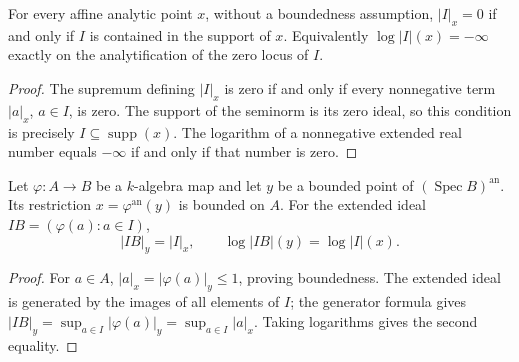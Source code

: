 \begin{lemma}
\label{lem:ideal-function-vanishing}
\leanok
{}
For every affine analytic point $x$, without a boundedness assumption,
$|I|_x=0$ if and only if $I$ is contained in the support of $x$.
Equivalently $\log|I|(x)=-\infty$ exactly on the analytification of the
zero locus of $I$.
\end{lemma}
\begin{proof}
The supremum defining $|I|_x$ is zero if and only if every nonnegative
term $|a|_x$, $a\in I$, is zero. The support of the seminorm is its
zero ideal, so this condition is precisely $I\subseteq\operatorname{supp}(x)$.
The logarithm of a nonnegative extended real number equals $-\infty$
if and only if that number is zero.
\end{proof}

\begin{lemma}
\label{lem:ideal-function-pullback}
\leanok
{}
Let $\varphi\colon A\to B$ be a $k$-algebra map and let $y$ be a
bounded point of $(\operatorname{Spec} B)^{\mathrm{an}}$. Its restriction
$x=\varphi^{\mathrm{an}}(y)$ is bounded on $A$. For the extended ideal
$IB=(\varphi(a):a\in I)$,
\[
 |IB|_y=|I|_x,\qquad \log|IB|(y)=\log|I|(x).
\]
\end{lemma}
\begin{proof}
For $a\in A$, $|a|_x=|\varphi(a)|_y\le1$, proving boundedness.
The extended ideal is generated by the images of all elements of $I$;
the generator formula gives
$|IB|_y=\sup_{a\in I}|\varphi(a)|_y=\sup_{a\in I}|a|_x$.
Taking logarithms gives the second equality.
\end{proof}
